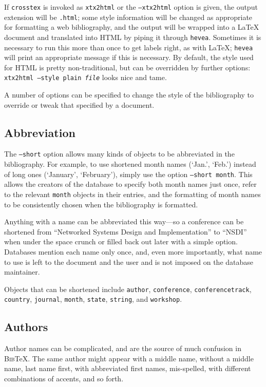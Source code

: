 \documentclass{article}
\newcommand{\BibTeX}{\textsc{Bib}\TeX}
\begin{document}
If \texttt{crosstex} is invoked as \texttt{xtx2html} or the
\texttt{--xtx2html} option is given, the output extension will be
\texttt{.html}; some style information will be changed as appropriate
for formatting a web bibliography, and the output will be wrapped
into a \LaTeX{} document and translated into HTML by piping it through
\texttt{hevea}. Sometimes it is necessary to run this more than once
to get labels right, as with \LaTeX{}; \texttt{hevea} will print an
appropriate message if this is necessary. By default, the style used
for HTML is pretty non-traditional, but can be overridden by further
options: \texttt{xtx2html --style plain \textrm{\textit{file}}} looks
nice and tame.

A number of options can be specified to change the style of the
bibliography to override or tweak that specified by a document.

\subsection{Abbreviation}

The \texttt{--short} option allows many kinds of objects to be abbreviated
in the bibliography. For example, to use shortened month names (`Jan.',
`Feb.') instead of long ones (`January', `February'), simply use
the option \texttt{--short month}. This allows the creators of the
database to specify both month names just once, refer to the relevant
\texttt{month} objects in their entries, and the formatting of month
names to be consistently chosen when the bibliography is formatted.

Anything with a name can be abbreviated this way---so a conference can
be shortened from ``Networked Systems Design and Implementation'' to
``NSDI'' when under the space crunch or filled back out later with a
simple option. Databases mention each name only once, and, even more
importantly, what name to use is left to the document and the user and
is not imposed on the database maintainer.

Objects that can be shortened include \texttt{author},
\texttt{conference}, \texttt{conferencetrack}, \texttt{country},
\texttt{journal}, \texttt{month}, \texttt{state}, \texttt{string},
and \texttt{workshop}.

\subsection{Authors}

Author names can be complicated, and are the source of much confusion
in \BibTeX{}. The same author might appear with a middle name, without a
middle name, last name first, with abbreviated first names, mis-spelled,
with different combinations of accents, and so forth.
\end{document}
